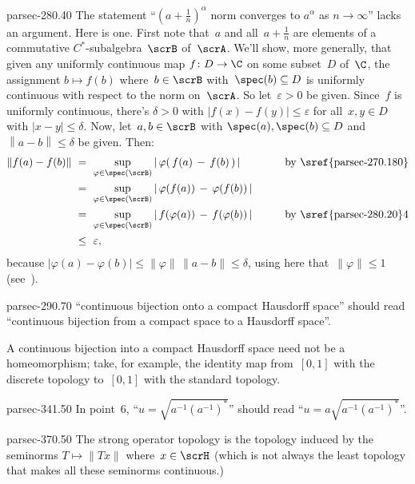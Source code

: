 \documentclass[b5page]{book}
\begin{document}
\begin{addendum}{parsec-280.40}
The statement ``$(a+\frac{1}{n})^\alpha$
norm converges to $a^\alpha$ as $n\to\infty$''
lacks an argument.
Here is one.
First note that~$a$ and all~$a+\frac{1}{n}$
are elements of a commutative $C^*$-subalgebra~$\scrB$
of~$\scrA$.
We'll show, more generally,
that given any uniformly continuous map $f\colon D\to\C$
on some subset~$D$ of~$\C$,
the assignment $b\mapsto f(b)$
where~$b\in \scrB$ with~$\spec(b)\subseteq D$
is uniformly continuous
with respect to the norm on~$\scrA$.
So let~$\varepsilon>0$ be given.
Since~$f$ is uniformly continuous,
there's $\delta>0$ with $\left|f(x)-f(y)\right|\leq\varepsilon$
for all~$x,y\in D$ with $\left|x-y\right|\leq \delta$.
Now, let~$a,b\in \scrB$ with
$\spec(a),\spec(b)\subseteq D$
and~$\left\|a-b\right\|\leq \delta$ be given. Then:
\begin{alignat*}{3}
\|f(a)-f(b)\|
\ &= \ \sup_{\varphi\in \spec(\scrB)}
\left|\,\varphi(\,f(a)\,-\,f(b)\,)\,\right|\qquad
&&\text{by~\sref{parsec-270.180}}
\\
\ &=\ \sup_{\varphi\in\spec(\scrB)}\left|
\,\varphi(f(a))\,-\,\varphi(f(b))\,\right|\qquad
&&
\\
\ &=\ \sup_{\varphi\in\spec(\scrB)}\left|
\,f(\varphi(a))\,-\,f(\varphi(b))\,\right|\qquad
&&\text{by~\sref{parsec-280.20}4}
\\
\ &\leq\ \varepsilon,
\end{alignat*}
because $\left|\varphi(a)-\varphi(b)\right|
\leq \|\varphi\|\,\|a-b\|\leq \delta$,
using here that~$\|\varphi\|\leq 1$
(see~).
\end{addendum}
\begin{erratum}{parsec-290.70}
``continuous bijection onto a compact Hausdorff space''
should read
``continuous bijection from a compact space
to a Hausdorff space''.

A continuous bijection into a compact Hausdorff space need not be a
homeomorphism; take, for example, the identity map from~$[0,1]$
with the discrete topology to~$[0,1]$ with the standard topology.
\end{erratum}
\begin{erratum}{parsec-341.50}
In point~6, ``$u=\sqrt{a^{-1}(a^{-1})^*}$''
should read ``$u=a\sqrt{a^{-1}(a^{-1})^*}$''.
\end{erratum}
\begin{erratum}{parsec-370.50}
The strong operator topology is the topology
induced by the seminorms $T\mapsto \|Tx\|$ where~$x\in \scrH$
(which is not always the least topology that makes
all these seminorms continuous.)
\end{erratum}
\end{document}
